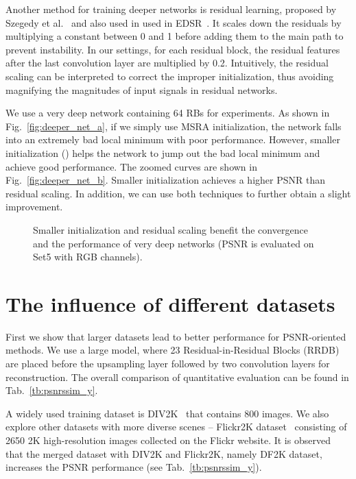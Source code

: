 \documentclass[runningheads]{llncs}
\begin{document}
Another method for training deeper networks is residual learning, proposed by Szegedy et 
al.~\cite{szegedy2016inception} and also used in used in EDSR~\cite{lim2017enhanced}.
It scales down the residuals by multiplying a constant between 0 and 1 before adding them to the main path to prevent 
instability. In our settings, for each residual block, the residual features after the last convolution layer are 
multiplied by 0.2.
Intuitively, the residual scaling can be interpreted to correct the improper initialization, thus avoiding magnifying 
the magnitudes of input signals in residual networks.

We use a very deep network containing 64 RBs for experiments. As shown in Fig.~\ref{fig:deeper_net_a}, if we simply 
use MSRA initialization, the network falls into an extremely bad local minimum with poor performance. 
However, smaller initialization () helps the network to jump out the bad local minimum and achieve good 
performance.
The zoomed curves are shown in Fig.~\ref{fig:deeper_net_b}. Smaller initialization achieves a higher PSNR than residual 
scaling. In addition, we can use both techniques to further obtain a slight improvement. 

\begin{figure}[htbp]\vspace{-0.4cm}
	\centering
	\qquad
	\caption{Smaller initialization and residual scaling benefit the convergence and the performance of very deep 
		networks (PSNR is evaluated on Set5 with RGB channels).}\label{fig:deeper_net}\vspace{-0.4cm}
\end{figure}

\section{The influence of different datasets} \label{sec:influence_datasets}

First we show that larger datasets lead to better performance for PSNR-oriented methods.
We use a large model, where 23 Residual-in-Residual Blocks (RRDB) are placed before 
the upsampling layer followed by two convolution layers for reconstruction.
The overall comparison of quantitative evaluation can be found in Tab.~\ref{tb:psnrssim_y}.

A widely used training dataset is DIV2K~\cite{agustsson2017ntire} that contains 800 images.
We also explore other datasets with more diverse scenes -- Flickr2K dataset~\cite{timofte2017ntire} consisting of 
2650 2K high-resolution images collected on the Flickr website.
It is observed that the merged dataset with DIV2K and Flickr2K, namely DF2K dataset, increases the PSNR performance  
 (see Tab.~\ref{tb:psnrssim_y}).
\end{document}
